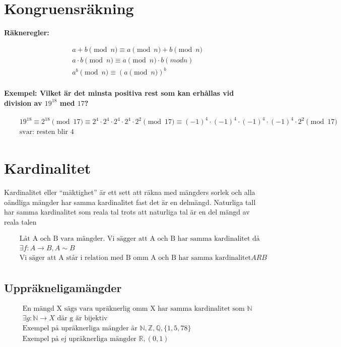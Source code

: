 \newpage

\section{Kongruensräkning}
\textbf{Räkneregler:}\par
\begin{align*}
  &\quad a+b \pmod{n} \equiv a \pmod{n} + b \pmod{n} \\
  &\quad a \cdot b \pmod{n} \equiv a \pmod{n} \cdot  b(modn) \\
  &\quad a^b \pmod{n} \equiv (a \pmod{n})^b \\
\end{align*}

\textbf{Exempel: Vilket är det minsta positiva rest som kan erhållas vid division av $19^{18}$ med $17$? }\par
\begin{align*}
  &\quad  19^{18} \equiv 2^{18} \pmod{17} \equiv 2^4 \cdot 2^4 \cdot 2^4 \cdot 2^4 \cdot 2^2 \pmod{17}
  \equiv {(-1)}^4 \cdot {(-1)}^4 \cdot {(-1)}^4 \cdot {(-1)}^4 \cdot 2^2 \pmod{17} \\
  &\quad \text{svar: resten blir } 4 \\
\end{align*}


\newpage

\section{Kardinalitet}
Kardinalitet eller ``mäktighet'' är ett sett att räkna med mängders sorlek och alla
oändliga mängder har samma kardinalitet fast det är en delmängd. Naturliga tall har samma
kardinalitet som reala tal trots att naturliga tal är en del mängd av reala talen

\begin{align*}
  &\quad \text{Låt A och B vara mängder. Vi sägger att A och B har samma kardinalitet då det finns en bijektion} \\
  &\quad \exists f: A \to B, A \sim B \\
  &\quad \text{Vi säger att A står i relation med B omm A och B har samma kardinalitet} ARB \\
\end{align*}

\subsection{Uppräkneligamängder}
\begin{align*}
  &\quad \text{En mängd X sägs vara upräknerlig omm X har samma kardinalitet som } \mathbb{N}  \\
  &\quad \exists g: \mathbb{N} \to X \text{ där g är bijektiv} \\
  &\quad \text{Exempel på upräknerliga mängder är } \mathbb{N}, \mathbb{Z}, \mathbb{Q}, \{ 1,5,78 \} \\
  &\quad \text{Exempel på ej upräknerliga mängder } \mathbb{R}, (0,1) \\ 
\end{align*}


